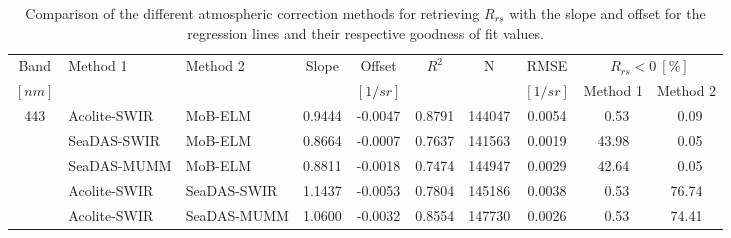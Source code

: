 \begin{landscape}

\begin{table}[htb!]
\vspace{.3cm}
\caption{ Comparison of the different atmospheric correction methods for retrieving $R_{rs}$ with the slope and offset for the regression lines and their respective goodness of fit values. \label{tab:RrsCompMethod} } 
\centering
\vspace{.2cm}
\begin{tabular}{cllccccccc} 
Band    &   Method 1      &  Method 2   & Slope   & Offset  & $R^2 $  & N       & RMSE    &\multicolumn{2}{c}{$R_{rs}<0~[\%]$}\\ 
$[nm]$  &                 &             &         & $[1/sr]$&         &         &$[1/sr]$ & Method 1    & Method 2         \\ \hline \hline
\multirow{6}{*}{443}&Acolite-SWIR&MoB-ELM     & 0.9444  & -0.0047 & 0.8791  & 144047  & 0.0054  &  ~0.53      & ~0.09                \\
      &   SeaDAS-SWIR   &  MoB-ELM      & 0.8664  & -0.0007 & 0.7637  & 141563  & 0.0019  &  43.98      & ~0.05             \\
      &   SeaDAS-MUMM   &  MoB-ELM      & 0.8811  & -0.0018 & 0.7474  & 144947  & 0.0029  &  42.64      & ~0.05             \\
      &   Acolite-SWIR  &  SeaDAS-SWIR  & 1.1437  & -0.0053 & 0.7804  & 145186  & 0.0038  &  ~0.53      & 76.74             \\
      &   Acolite-SWIR  &  SeaDAS-MUMM  & 1.0600  & -0.0032 & 0.8554  & 147730  & 0.0026  &  ~0.53      & 74.41             \\

\end{tabular}
\end{table}
\end{landscape}
